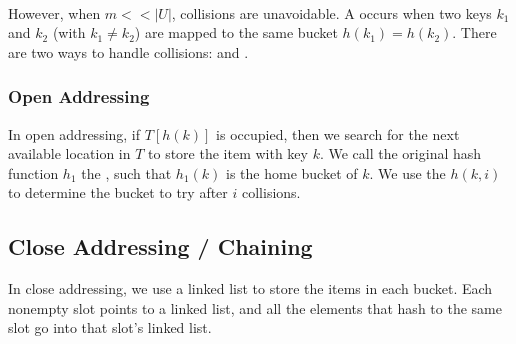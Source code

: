 {~~~}

However, when $m << |U|$, collisions are unavoidable. A  occurs when two keys $k_1$ and $k_2$ (with $k_1 \neq k_2$) are mapped to the same bucket $h(k_1) = h(k_2)$. There are two ways to handle collisions:  and .

\subsubsection{Open Addressing}

In open addressing, if $T[h(k)]$ is occupied, then we search for the next available location in $T$ to store the item with key $k$. We call the original hash function $h_1$ the , such that $h_1(k)$ is the home bucket of $k$. We use the  $h(k, i)$ to determine the bucket to try after $i$ collisions. 


\subsection{Close Addressing / Chaining}

In close addressing, we use a linked list to store the items in each bucket. Each nonempty slot points to a linked list, and all the elements that hash to the same slot go into that slot's linked list. 


